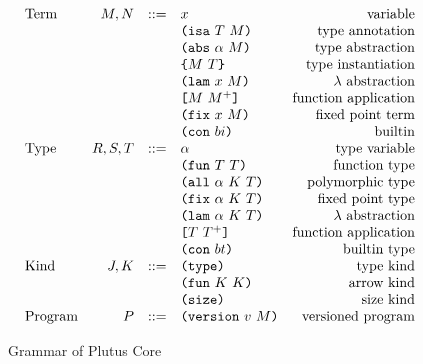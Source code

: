 \documentclass[../main.tex]{subfiles}
\begin{document}
\begin{figure*}[t]
    \centering
    \[\begin{array}{lrclr}
        \textrm{Term}             & M, N  & ::= & x                          & \textrm{variable}\\
                                  &       &     & \ann{M}{T}                 & \textrm{type annotation}\\
                                  &       &     & \abs{\alpha}{M}            & \textrm{type abstraction}\\
                                  &       &     & \inst{M}{T}                & \textrm{type instantiation}\\
                                  &       &     & \lam{x}{M}                 & \textrm{$\lambda$ abstraction}\\
                                  &       &     & \app{M}{M^+}               & \textrm{function application}\\
                                  &       &     & \fix{x}{M}                 & \textrm{fixed point term}\\
                                  &       &     & \con{bi}               & \textrm{builtin}\\
        \textrm{Type}             & R,S,T & ::= & \alpha                     & \textrm{type variable}\\
                                  &       &     & \funT{T}{T}                & \textrm{function type}\\
                                  &       &     & \allT{\alpha}{K}{T}        & \textrm{polymorphic type}\\
                                  &       &     & \fixT{\alpha}{K}{T}        & \textrm{fixed point type}\\
                                  &       &     & \lamT{\alpha}{K}{T}        & \textrm{$\lambda$ abstraction}\\
                                  &       &     & \appT{T}{T^+}              & \textrm{function application}\\
                                  &       &     & \conT{bt}                  & \textrm{builtin type}\\
        \textrm{Kind}             & J,K   & ::= & \typeK{}                   & \textrm{type kind}\\
                                  &       &     & \funK{K}{K}                & \textrm{arrow kind}\\
                                  &       &     & \sizeK{}                   & \textrm{size kind}\\
        \textrm{Program}          & P     & ::= & \version{v}{M}             & \textrm{versioned program}\\

    \end{array}\]
    \caption{Grammar of Plutus Core}
    \label{fig:Plutus_core_grammar}
\end{figure*}
\end{document}
